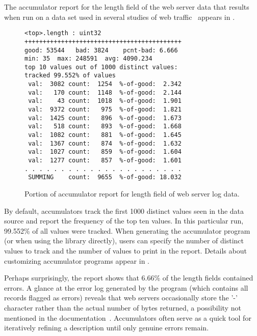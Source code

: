 The accumulator report for the length field
of the web server data that results when run on a data set used
in several studies of web traffic~\cite{clf-cluster, clf-adaptation}
appears in .
%
\begin{figure*}
\begin{small}
\begin{verbatim}
<top>.length : uint32
+++++++++++++++++++++++++++++++++++++++++++
good: 53544   bad: 3824    pcnt-bad: 6.666
min: 35  max: 248591  avg: 4090.234
top 10 values out of 1000 distinct values:
tracked 99.552% of values
 val:  3082 count:  1254  %-of-good:  2.342
 val:   170 count:  1148  %-of-good:  2.144
 val:    43 count:  1018  %-of-good:  1.901
 val:  9372 count:   975  %-of-good:  1.821
 val:  1425 count:   896  %-of-good:  1.673
 val:   518 count:   893  %-of-good:  1.668
 val:  1082 count:   881  %-of-good:  1.645
 val:  1367 count:   874  %-of-good:  1.632
 val:  1027 count:   859  %-of-good:  1.604
 val:  1277 count:   857  %-of-good:  1.601
. . . . . . . . . . . . . . . . . . . . . . 
 SUMMING    count:  9655  %-of-good: 18.032
\end{verbatim}
\end{small}
\caption{Portion of accumulator report for length field of web server
  log data.}
\label{figure:wsl-accum-report}
\end{figure*}
%
By default, accumulators track the first 1000 distinct
values seen in the data source and report the frequency
of the top ten values.  In this particular run, 99.552\%
of all values were tracked.  When generating the accumulator
program (or when using the library directly), \pads{} users can specify 
the number of distinct values to track and the number 
of values to print in the report.  Details about customizing accumulator programs appear in .

Perhaps surprisingly, the report shows that 6.66\% of the length
fields contained errors.  A glance at the error log generated
by the program (which contains all records flagged as errors) 
reveals that web servers occasionally store the '-' character
rather than the actual number of bytes returned, a possibility
not mentioned in the documentation~\cite{wpp}.
Accumulators often serve as a quick tool for iteratively
refining a \pads{} description until only genuine errors remain.




